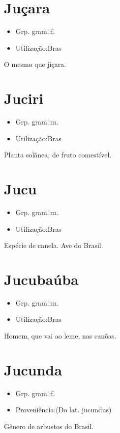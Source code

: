 \documentclass{article}
\begin{document}
\section{Juçara}
\begin{itemize}
\item {Grp. gram.:f.}
\end{itemize}
\begin{itemize}
\item {Utilização:Bras}
\end{itemize}
O mesmo que \textunderscore jiçara\textunderscore .
\section{Juciri}
\begin{itemize}
\item {Grp. gram.:m.}
\end{itemize}
\begin{itemize}
\item {Utilização:Bras}
\end{itemize}
Planta solânea, de fruto comestível.
\section{Jucu}
\begin{itemize}
\item {Grp. gram.:m.}
\end{itemize}
\begin{itemize}
\item {Utilização:Bras}
\end{itemize}
Espécie de canela.
Ave do Brasil.
\section{Jucubaúba}
\begin{itemize}
\item {Grp. gram.:m.}
\end{itemize}
\begin{itemize}
\item {Utilização:Bras}
\end{itemize}
Homem, que vai ao leme, nas canôas.
\section{Jucunda}
\begin{itemize}
\item {Grp. gram.:f.}
\end{itemize}
\begin{itemize}
\item {Proveniência:(Do lat. \textunderscore jucundus\textunderscore )}
\end{itemize}
Gênero de arbustos do Brasil.
\end{document}
